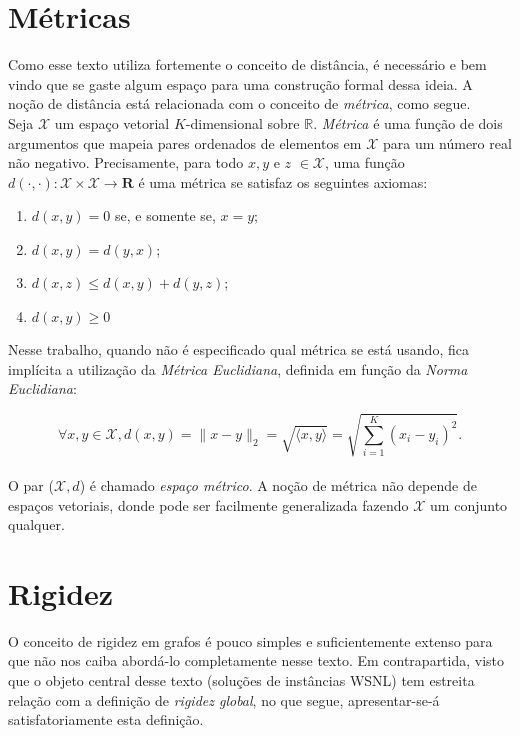 \chapter{Métricas}
\label{ap:metric}

Como esse texto utiliza fortemente o conceito de distância, é necessário e bem vindo que se gaste algum espaço para uma construção formal dessa ideia. A noção de distância está relacionada com o conceito de \textit{métrica}, como segue.
\\

Seja $\mathcal{X}$ um espaço vetorial $K$-dimensional sobre $\mathbb{R}$. \textit{Métrica} é uma função de dois argumentos que mapeia pares ordenados de elementos em $\mathcal{X}$ para um número real não negativo. Precisamente, para todo $x, y$ e $z$ $\in \mathcal{X}$, uma função $d(\cdot,\cdot): \mathcal{X} \times \mathcal{X} \longrightarrow \mathbf{R}$ é uma métrica se satisfaz os seguintes axiomas:

\begin{enumerate}
	\item $d(x,y) = 0$ se, e somente se, $x = y$; 
	\item $d(x,y) = d(y,x)$;
	\item $d(x,z) \leq d(x,y) + d(y,z)$;
	\item $d(x,y) \geq 0$
\end{enumerate}

Nesse trabalho, quando não é especificado qual métrica se está usando, fica implícita a utilização da \textit{Métrica Euclidiana}, definida em função da \textit{Norma Euclidiana}:

\begin{equation}\tag{Norma Euclidiana}
\forall x, y \in \mathcal{X}, d(x,y) = \lVert x-y \rVert_2 = \sqrt{\langle x, y\rangle} = \sqrt{\sum_{i = 1}^{K} (x_i-y_i)^2}.
\label{eq:normaEuclidiana}
\end{equation}
\\

O par ($\mathcal{X}, d$) é chamado \textit{espaço métrico}. A noção de métrica não depende de espaços vetoriais, donde pode ser facilmente generalizada fazendo $\mathcal{X}$ um conjunto qualquer.

\chapter{Rigidez}
\label{ap:rigid}

O conceito de rigidez em grafos é pouco simples e suficientemente extenso para que não nos caiba abordá-lo completamente nesse texto. Em contrapartida, visto que o objeto central desse texto (soluções de instâncias WSNL) tem estreita relação com a definição de \textit{rigidez global}, no que segue, apresentar-se-á satisfatoriamente esta definição. 

